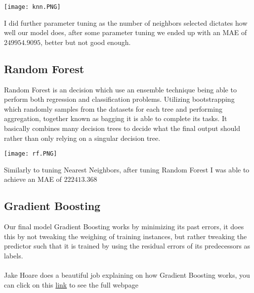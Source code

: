 \documentclass{article}
\begin{document}
\begin{titlepage}
\begin{center}
\texttt{[image: knn.PNG]}
\end{center}

I did further parameter tuning as the number of neighbors selected dictates how well our model does, after some parameter tuning we ended up with an MAE of $249954.9095$, better but not good enough.
\subsection{Random Forest}

Random Forest is an decision which use an ensemble technique being able to perform both regression and classification problems. Utilizing  bootstrapping which randomly samples from the datasets for each tree and performing aggregation, together known as bagging it is able to complete its tasks. It basically combines many decision trees to decide what the final output should rather than only relying on a singular decision tree.

\begin{center}
\texttt{[image: rf.PNG]}
\end{center}

Similarly to tuning Nearest Neighbors, after tuning Random Forest I was able to achieve an MAE of $222413.368$

\subsection{Gradient Boosting}

Our final model Gradient Boosting works by minimizing its past errors, it does this by not tweaking the weighing of training instances, but rather tweaking the predictor such that it is trained by using the residual errors of its predecessors as labels. \\
\\

Jake Hoare does  a beautiful job explaining on how Gradient Boosting works, you can click on this  \href{https://www.geeksforgeeks.org/ml-gradient-boosting/}{link} to see the full webpage


\end{titlepage}
\end{document}
